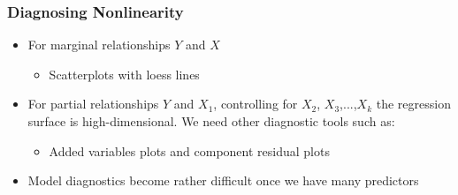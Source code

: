 \documentclass{beamer}
\numberwithin{equation}{section}
\begin{document}
\begin{frame}[fragile]

\frametitle{Diagnosing Nonlinearity}

\begin{itemize}
\item For \alert{marginal} relationships $Y$ and $X$
\begin{itemize}
  \item Scatterplots with loess lines
\end{itemize}\bigskip \pause
\item For \alert{partial} relationships $Y$ and $X_1$, controlling for $X_2$, $X_3$,...,$X_k$ the regression surface is high-dimensional. We need other diagnostic tools such as:
\begin{itemize}
  \item Added variables plots and component residual plots 
  \end{itemize}\bigskip
  \item Model diagnostics become rather difficult once we have many predictors
\end{itemize}

\end{frame}
\end{document}
